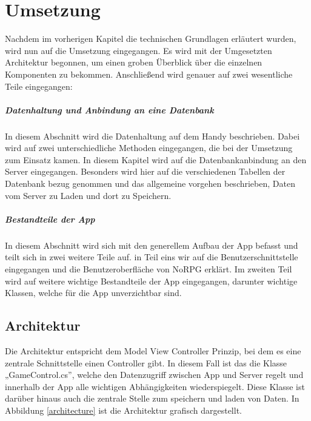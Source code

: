 \chapter{Umsetzung}
	Nachdem im vorherigen Kapitel die technischen Grundlagen erläutert wurden, wird nun auf die Umsetzung eingegangen. Es wird mit der Umgesetzten Architektur begonnen, um einen groben Überblick über die einzelnen Komponenten zu bekommen. Anschließend wird genauer auf zwei wesentliche Teile eingegangen:

	\paragraph{Datenhaltung und Anbindung an eine Datenbank}
		In diesem Abschnitt wird die Datenhaltung auf dem Handy beschrieben. Dabei wird auf zwei unterschiedliche Methoden eingegangen, die bei der Umsetzung zum Einsatz kamen. In diesem Kapitel wird auf die Datenbankanbindung an den Server eingegangen. Besonders wird hier auf die verschiedenen Tabellen der Datenbank bezug genommen und das allgemeine vorgehen beschrieben, Daten vom Server zu Laden und dort zu Speichern.

	\paragraph{Bestandteile der App}
		In diesem Abschnitt wird sich mit den generellem Aufbau der App befasst und teilt sich in zwei weitere Teile auf. in Teil eins wir auf die Benutzerschnittstelle eingegangen und die Benutzeroberfläche von NoRPG erklärt. Im zweiten Teil wird auf weitere wichtige Bestandteile der App eingegangen, darunter wichtige Klassen, welche für die App unverzichtbar sind.

	\section{Architektur}
		Die Architektur entspricht dem Model View Controller Prinzip, bei dem es eine zentrale Schnittstelle einen Controller gibt. In diesem Fall ist das die Klasse „GameControl.cs”, welche den Datenzugriff  zwischen App und Server regelt und innerhalb der App alle wichtigen Abhängigkeiten wiederspiegelt. Diese Klasse ist darüber hinaus auch die zentrale Stelle zum speichern und laden von Daten. In Abbildung \ref{architecture} ist die Architektur grafisch dargestellt.


